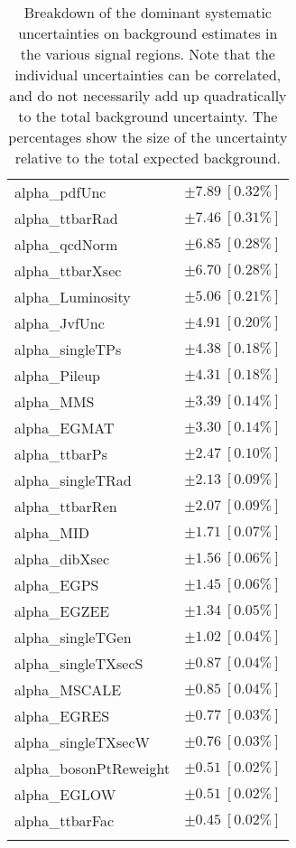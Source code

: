 \begin{table}
\begin{center}
\begin{tabular*}{\textwidth}{@{\extracolsep{\fill}}lc}
alpha\_pdfUnc         & $\pm 7.89\ [0.32\%] $       \\
alpha\_ttbarRad         & $\pm 7.46\ [0.31\%] $       \\
alpha\_qcdNorm         & $\pm 6.85\ [0.28\%] $       \\
alpha\_ttbarXsec         & $\pm 6.70\ [0.28\%] $       \\
alpha\_Luminosity         & $\pm 5.06\ [0.21\%] $       \\
alpha\_JvfUnc         & $\pm 4.91\ [0.20\%] $       \\
alpha\_singleTPs         & $\pm 4.38\ [0.18\%] $       \\
alpha\_Pileup         & $\pm 4.31\ [0.18\%] $       \\
alpha\_MMS         & $\pm 3.39\ [0.14\%] $       \\
alpha\_EGMAT         & $\pm 3.30\ [0.14\%] $       \\
alpha\_ttbarPs         & $\pm 2.47\ [0.10\%] $       \\
alpha\_singleTRad         & $\pm 2.13\ [0.09\%] $       \\
alpha\_ttbarRen         & $\pm 2.07\ [0.09\%] $       \\
alpha\_MID         & $\pm 1.71\ [0.07\%] $       \\
alpha\_dibXsec         & $\pm 1.56\ [0.06\%] $       \\
alpha\_EGPS         & $\pm 1.45\ [0.06\%] $       \\
alpha\_EGZEE         & $\pm 1.34\ [0.05\%] $       \\
alpha\_singleTGen         & $\pm 1.02\ [0.04\%] $       \\
alpha\_singleTXsecS         & $\pm 0.87\ [0.04\%] $       \\
alpha\_MSCALE         & $\pm 0.85\ [0.04\%] $       \\
alpha\_EGRES         & $\pm 0.77\ [0.03\%] $       \\
alpha\_singleTXsecW         & $\pm 0.76\ [0.03\%] $       \\
alpha\_bosonPtReweight         & $\pm 0.51\ [0.02\%] $       \\
alpha\_EGLOW         & $\pm 0.51\ [0.02\%] $       \\
alpha\_ttbarFac         & $\pm 0.45\ [0.02\%] $       \\
\noalign{\smallskip}\hline\noalign{\smallskip}
\end{tabular*}
\end{center}
\caption[Breakdown of uncertainty on background estimates]{
Breakdown of the dominant systematic uncertainties on background estimates in the various signal regions.
Note that the individual uncertainties can be correlated, and do not necessarily add up quadratically to 
the total background uncertainty. The percentages show the size of the uncertainty relative to the total expected background.
\label{table.results.bkgestimate.uncertainties.SR}}
\end{table}
%